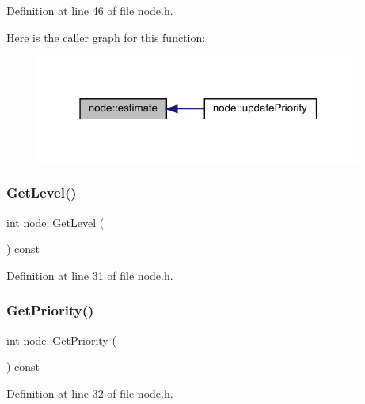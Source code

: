Definition at line 46 of file node.\+h.

Here is the caller graph for this function\+:\nopagebreak
\begin{figure}[H]
\begin{center}
\leavevmode
\includegraphics[width=304pt]{classnode_acd0a1c2330a9984fa120fe7a6f169680_icgraph}
\end{center}
\end{figure}
\mbox{\label{classnode_a8f168b85b9bdf0a837f5070e5af6f009}} 
\subsubsection{\texorpdfstring{Get\+Level()}{GetLevel()}}
{\footnotesize\ttfamily int node\+::\+Get\+Level (\begin{DoxyParamCaption}{ }\end{DoxyParamCaption}) const\hspace{0.3cm}{\ttfamily [inline]}}



Definition at line 31 of file node.\+h.

\mbox{\label{classnode_afa8c64a3cf2d61348b69b7e68233aa8d}} 
\subsubsection{\texorpdfstring{Get\+Priority()}{GetPriority()}}
{\footnotesize\ttfamily int node\+::\+Get\+Priority (\begin{DoxyParamCaption}{ }\end{DoxyParamCaption}) const\hspace{0.3cm}{\ttfamily [inline]}}



Definition at line 32 of file node.\+h.

\mbox{\label{classnode_a32e22b8a1fb6be6efa7348cc848600cf}} 
